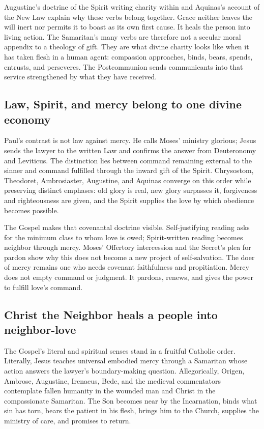 Augustine's doctrine of the Spirit writing charity within and Aquinas's account
of the New Law explain why these verbs belong together. Grace neither leaves
the will inert nor permits it to boast as its own first cause. It heals the
person into living action. The Samaritan's many verbs are therefore not a
secular moral appendix to a theology of gift. They are what divine charity
looks like when it has taken flesh in a human agent: compassion approaches,
binds, bears, spends, entrusts, and perseveres. The Postcommunion sends
communicants into that service strengthened by what they have received.

\subsection*{Law, Spirit, and mercy belong to one divine economy}

Paul's contrast is not law against mercy. He calls Moses' ministry glorious;
Jesus sends the lawyer to the written Law and confirms the answer from
Deuteronomy and Leviticus. The distinction lies between command remaining
external to the sinner and command fulfilled through the inward gift of the
Spirit. Chrysostom, Theodoret, Ambrosiaster, Augustine, and Aquinas converge on
this order while preserving distinct emphases: old glory is real, new glory
surpasses it, forgiveness and righteousness are given, and the Spirit supplies
the love by which obedience becomes possible.

The Gospel makes that covenantal doctrine visible. Self-justifying reading
asks for the minimum class to whom love is owed; Spirit-written reading becomes
neighbor through mercy. Moses' Offertory intercession and the Secret's plea for
pardon show why this does not become a new project of self-salvation. The doer
of mercy remains one who needs covenant faithfulness and propitiation. Mercy
does not empty command or judgment. It pardons, renews, and gives the power to
fulfill love's command.

\subsection*{Christ the Neighbor heals a people into neighbor-love}

The Gospel's literal and spiritual senses stand in a fruitful Catholic order.
Literally, Jesus teaches universal embodied mercy through a Samaritan whose
action answers the lawyer's boundary-making question. Allegorically, Origen,
Ambrose, Augustine, Irenaeus, Bede, and the medieval commentators contemplate
fallen humanity in the wounded man and Christ in the compassionate Samaritan.
The Son becomes near by the Incarnation, binds what sin has torn, bears the
patient in his flesh, brings him to the Church, supplies the ministry of care,
and promises to return.

